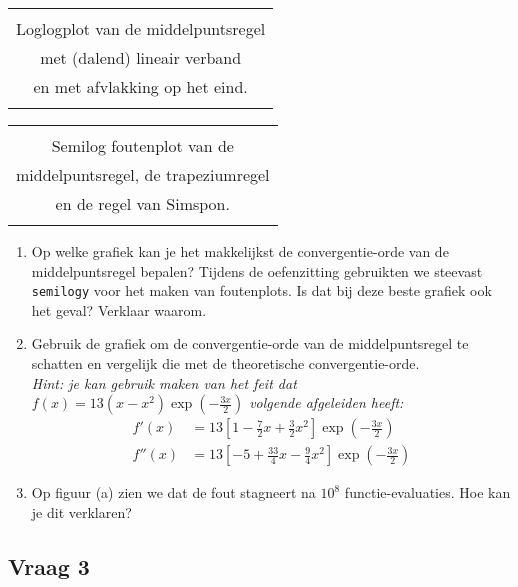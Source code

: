 \documentclass[kulak]{kulakarticle}
\begin{document}
	\begin{table}[h!]
		\centering
		\begin{tabular}{|c|}
			\hline \\
			Loglogplot van de middelpuntsregel \\ met (dalend) lineair verband\\
			en met afvlakking op het eind. \\ \\\hline
		\end{tabular}
		\hspace{1cm}
		\begin{tabular}{|c|}
		\hline\\
		Semilog foutenplot van de \\
		middelpuntsregel, de trapeziumregel\\
		en de regel van Simspon.  \\ \\\hline
		\end{tabular}
	\end{table}

	\begin{enumerate}
		\item Op welke grafiek kan je het makkelijkst de convergentie-orde van de middelpuntsregel bepalen? Tijdens de oefenzitting gebruikten we steevast \texttt{semilogy} voor het maken van foutenplots. Is dat bij deze beste grafiek ook het geval? Verklaar waarom.

		\item Gebruik de grafiek om de convergentie-orde van de middelpuntsregel te schatten en vergelijk die met de theoretische convergentie-orde.\\
		\textit{Hint: je kan gebruik maken van het feit dat \(f(x)=13(x-x^2)\exp\left(-\frac{3x}{2}\right)\) volgende afgeleiden heeft:}
		\begin{align*}
			f'(x) &= 13\left[1-\frac{7}{2}x+\frac{3}{2}x^2\right] \exp\left(-\frac{3x}{2}\right)\\
			f''(x) &= 13\left[-5+\frac{33}{4}x-\frac{9}{4}x^2\right] \exp\left(-\frac{3x}{2}\right)
		\end{align*}

		\item Op figuur (a) zien we dat de fout stagneert na \(10^{8}\) functie-evaluaties. Hoe kan je dit verklaren?

	\end{enumerate}

	\newpage

	\subsection*{Vraag 3}
\end{document}

